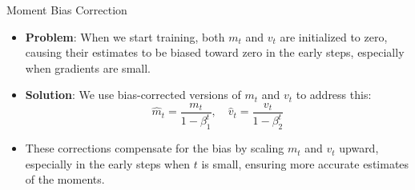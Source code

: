 \documentclass[serif, aspectratio=169]{beamer}
\begin{document}
\begin{frame}{Moment Bias Correction}
    \begin{itemize}
        \item \textbf{Problem}: When we start training, both $m_{t}$ and $v_{t}$ are initialized to zero, causing their estimates to be biased toward zero in the early steps, especially when gradients are small.
        \item \textbf{Solution}: We use bias-corrected versions of $m_{t}$ and $v_{t}$ to address this:
        \[\hat{m}_{t} = \frac{m_{t}}{1 - \beta_1^{t}}, \quad 
        \hat{v}_{t} = \frac{v_{t}}{1 -\beta_2^{t}}\]
        \item These corrections compensate for the bias by scaling $m_{t}$ and $v_{t}$ upward, especially in the early steps when $t$ is small, ensuring more accurate estimates of the moments.
    \end{itemize}
\end{frame}



\end{document}
